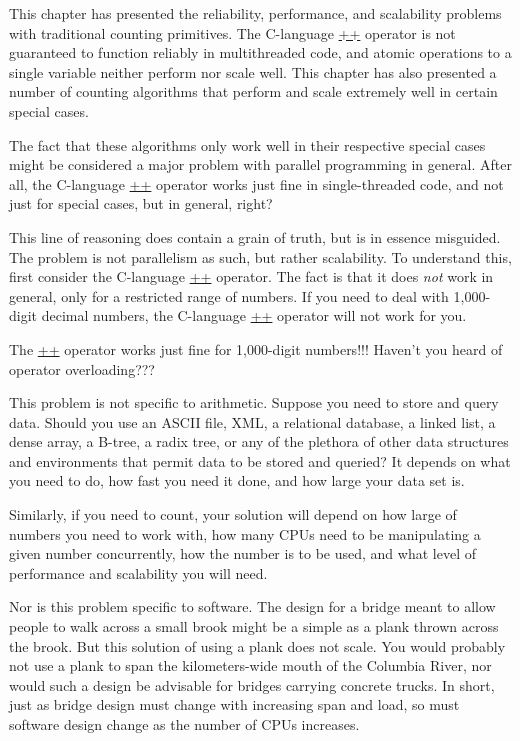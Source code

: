 This chapter has presented the reliability, performance, and
scalability problems with traditional counting primitives.
The C-language \url{++} operator is not guaranteed to function reliably in
multithreaded code, and atomic operations to a single variable neither
perform nor scale well.
This chapter has also presented a number of counting algorithms that
perform and scale extremely well in certain special cases.

The fact that these algorithms only work well in their respective special
cases might be considered a major problem with parallel programming in
general.
After all, the C-language \url{++} operator works just fine in single-threaded
code, and not just for special cases, but in general, right?

This line of reasoning does contain a grain of truth, but is in essence
misguided.
The problem is not parallelism as such, but rather scalability.
To understand this, first consider the C-language \url{++} operator.
The fact is that it does \emph{not} work in general, only for a restricted
range of numbers.
If you need to deal with 1,000-digit decimal numbers, the C-language \url{++}
operator will not work for you.

\QuickQuiz{}
	The \url{++} operator works just fine for 1,000-digit numbers!!!
	Haven't you heard of operator overloading???
 \QuickQuizEnd

This problem is not specific to arithmetic.
Suppose you need to store and query data.
Should you use an ASCII file, XML, a relational database, a linked list,
a dense array, a B-tree, a radix tree, or any of the plethora of other data
structures and environments that permit data to be stored and queried?
It depends on what you need to do, how fast you need it done, and how
large your data set is.

Similarly, if you need to count, your solution will depend on how large
of numbers you need to work with, how many CPUs need to be manipulating
a given number concurrently, how the number is to be used, and what
level of performance and scalability you will need.

Nor is this problem specific to software.
The design for a bridge meant to allow people to walk across a small brook
might be a simple as a plank thrown across the brook.
But this solution of using a plank does not scale.
You would probably not use a plank to span the kilometers-wide mouth of
the Columbia River, nor would such a design be advisable for bridges
carrying concrete trucks.
In short, just as bridge design must change with increasing span and load,
so must software design change as the number of CPUs increases.

